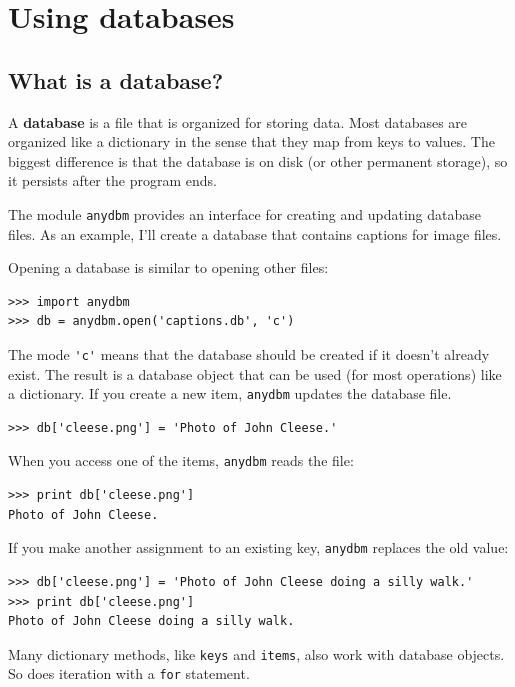 \chapter{Using databases}

\section{What is a database?}

A {\bf database} is a file that is organized for storing data.
Most databases are organized like a dictionary in the sense
that they map from keys to values.  The biggest difference
is that the database is on disk (or other permanent storage),
so it persists after the program ends.


The module {\tt anydbm} provides an interface for creating
and updating database files.  As an example, I'll create a database
that contains captions for image files.


Opening a database is similar
to opening other files:

\beforeverb
\begin{verbatim}
>>> import anydbm
>>> db = anydbm.open('captions.db', 'c')
\end{verbatim}
\afterverb
%
The mode \verb"'c'" means that the database should be created if
it doesn't already exist.  The result is a database object
that can be used (for most operations) like a dictionary.
If you create a new item, {\tt anydbm} updates the database file.



\beforeverb
\begin{verbatim}
>>> db['cleese.png'] = 'Photo of John Cleese.'
\end{verbatim}
\afterverb
%
When you access one of the items, {\tt anydbm} reads the file:

\beforeverb
\begin{verbatim}
>>> print db['cleese.png']
Photo of John Cleese.
\end{verbatim}
\afterverb
%
If you make another assignment to an existing key, {\tt anydbm} replaces
the old value:

\beforeverb
\begin{verbatim}
>>> db['cleese.png'] = 'Photo of John Cleese doing a silly walk.'
>>> print db['cleese.png']
Photo of John Cleese doing a silly walk.
\end{verbatim}
\afterverb
%
Many dictionary methods, like {\tt keys} and {\tt items}, also
work with database objects.  So does iteration with a {\tt for}
statement.

